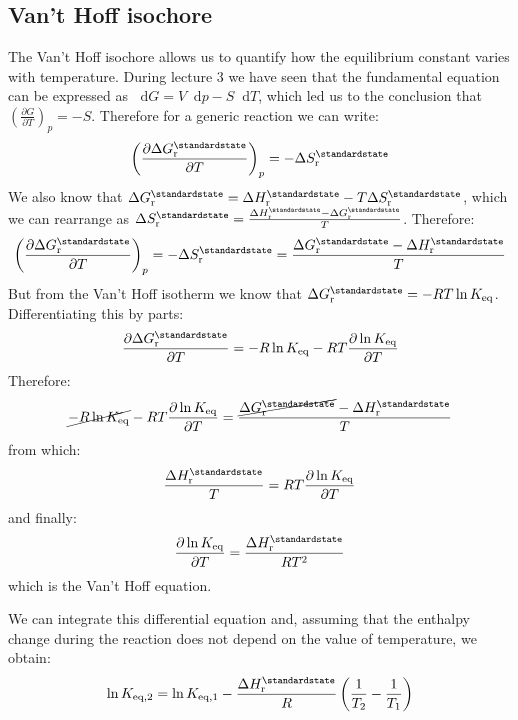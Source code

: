 \documentclass[12pt,a4paper]{report}
\newcommand*\diff{\mathop{}\!\mathrm{d}}
\begin{document}
   \subsection*{Van't Hoff isochore}
   The Van't Hoff isochore allows us to quantify how the equilibrium constant varies with temperature.
   During lecture 3 we have seen that the fundamental equation can be expressed as $\diff G = V\diff p-S\diff T$, which led us to the conclusion that $\left(\frac{\partial G}{\partial T}\right)_{p}=-S$. Therefore for a generic reaction we can write:
   \begin{equation*}
   \left(\frac{\partial \Delta G^{\standardstate}_{\mathrm{r}}}{\partial T}\right)_{p}=-\Delta S^{\standardstate}_{\mathrm{r}}
   \end{equation*}
   We also know that $\Delta G^{\standardstate}_{\mathrm{r}} = \Delta H^{\standardstate}_{\mathrm{r}}-T\Delta S^{\standardstate}_{\mathrm{r}}$, which we can rearrange as $\Delta S^{\standardstate}_{\mathrm{r}} = \frac{\Delta H^{\standardstate}_{\mathrm{r}}-\Delta G^{\standardstate}_{\mathrm{r}}}{T}$.
   Therefore:
   \begin{equation*}
   \left(\frac{\partial \Delta G^{\standardstate}_{\mathrm{r}}}{\partial T}\right)_{p}=-\Delta S^{\standardstate}_{\mathrm{r}} = \frac{\Delta G^{\standardstate}_{\mathrm{r}}-\Delta H^{\standardstate}_{\mathrm{r}}}{T}
   \end{equation*}
   But from the Van't Hoff isotherm we know that $\Delta G^{\standardstate}_{\mathrm{r}} =-RT \ln K_{\mathrm{eq}}$. Differentiating this by parts:
   \begin{equation*}
   \frac{\partial\Delta G^{\standardstate}_{\mathrm{r}}}{\partial T}=-R\ln K_{\mathrm{eq}}-RT \frac{\partial \ln K_{\mathrm{eq}}}{\partial T}
   \end{equation*}
   Therefore:
   \begin{equation*}
  \cancel{-R\ln K_{\mathrm{eq}}}-RT \frac{\partial \ln K_{\mathrm{eq}}}{\partial T}=\frac{\cancel{\Delta G^{\standardstate}_{\mathrm{r}}}-\Delta H^{\standardstate}_{\mathrm{r}}}{T}
   \end{equation*}
   from which:
   \begin{equation*}
   \frac{\Delta H^{\standardstate}_{\mathrm{r}}}{T}=RT \frac{\partial \ln K_{\mathrm{eq}}}{\partial T}
   \end{equation*}   
   and finally:
   \begin{equation*}
   \frac{\partial \ln K_{\mathrm{eq}}}{\partial T} = \frac{\Delta H^{\standardstate}_{\mathrm{r}}}{RT^{2}}
   \end{equation*} 
   which is the Van't Hoff equation.
  
   We can integrate this differential equation and, assuming that the enthalpy change during the reaction does not depend on the value of temperature, we obtain:
    \begin{equation*}
   \ln K_{\mathrm{eq,2}}=\ln K_{\mathrm{eq,1}}-\frac{\Delta H^{\standardstate}_{\mathrm{r}}}{R}\left(\frac{1}{T_{2}}-\frac{1}{T_{1}}\right)
   \end{equation*} 
\end{document}
